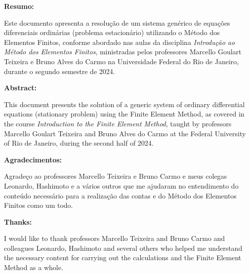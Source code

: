 \maketitle
\newpage

\begin{center}
  \textbf{Resumo:}
\end{center}

  Este documento apresenta a resolução de um sistema genérico de equações diferenciais ordinárias (problema estacionário) utilizando o Método dos Elementos Finitos, conforme abordado nas aulas da disciplina \textit{Introdução ao Método dos Elementos Finitos}, ministradas pelos professores Marcello Goulart Teixeira e Bruno Alves do Carmo na Universidade Federal do Rio de Janeiro, durante o segundo semestre de 2024.

  \vspace{0.3cm}

  \begin{center}
    \textbf{Abstract:}
  \end{center}

  This document presents the solution of a generic system of ordinary differential equations (stationary problem) using the Finite Element Method, as covered in the course \textit{Introduction to the Finite Element Method}, taught by professors Marcello Goulart Teixeira and Bruno Alves do Carmo at the Federal University of Rio de Janeiro, during the second half of 2024.

\vspace{0.3cm}

\begin{center}
  \textbf{Agradecimentos:}
\end{center}

  Agradeço ao professores Marcello Teixeira e Bruno Carmo e meus colegas Leonardo, Hashimoto e a vários outros que me ajudaram no entendimento do conteúdo necessário para a realização das contas e do Método dos Elementos Finitos como um todo.

\vspace{0.3cm}

\begin{center}
  \textbf{Thanks:}
\end{center}

  I would like to thank professors Marcello Teixeira and Bruno Carmo and colleagues Leonardo, Hashimoto and several others who helped me understand the necessary content for carrying out the calculations and the Finite Element Method as a whole.

\newpage \tableofcontents
\newpage
